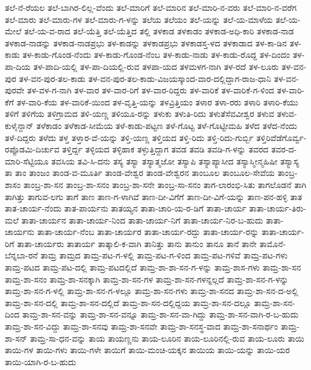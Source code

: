 ತಲೆ-ನೆ-ರೆಯಲ
ತಲೆ-ಬಾಗಿರ-ಲಿಲ್ಲ-ವೆಂದು
ತಲೆ-ಮಾರಿಗೆ
ತಲೆ-ಮಾರಿನ
ತಲೆ-ಮಾರಿ-ನ-ವರು
ತಲೆ-ಮಾರಿ-ನ-ವರೆಗ
ತಲೆ-ಮಾರು
ತಲೆ-ಮಾರು-ಗಳ
ತಲೆ-ಮಾರು-ಗ-ಳನ್ನು
ತಲೆಯ
ತಲೆಯಂ
ತಲೆ-ಯನ್ನು
ತಲೆ-ಯ-ಮಾಳೆಯ
ತಲೆ-ಯ-ಮೇಲೆ
ತಲೆ-ಯ-ವ-ರಾದ
ತಲೆ-ಯೆತ್ತಿ
ತಲೆ-ಯೆತ್ತಿದ
ತಲ್ಲಿ
ತಳಕಾಡ
ತಳಕಾಡಂ
ತಳಕಾಡ-ಅಧಿ-ಕಾರಿ
ತಳಕಾಡ-ನಾಡ
ತಳಕಾಡ-ನಾಡನ್ನು
ತಳಕಾಡ-ನಾಡಪ್ರಭು
ತಳ-ಕಾಡನ್ನು
ತಳಕಾಡಪ್ರಭು
ತಳಕಾಡಸ್ತ-ಳದ
ತಳಕಾಡಾದ
ತಳ-ಕಾ-ಡಿನ
ತಳ-ಕಾಡು
ತಳ-ಕಾಡು-ಗೊಂಡ-ನೆಂದು
ತಳ-ಕಾಡು-ಗೊಂಡ-ನೆಂಬ
ತಳ-ಕಾಡು-ನಾಡು
ತಳ-ಕಾಡು-ರೊದ್ದ
ತಳ-ದಿಂದಂ
ತಳ-ಪಾ-ದಿಯ
ತಳ-ಪಾದಿ-ಯಲ್ಲಿ
ತಳ-ಪಾ-ದಿಯಲ್ಲಿ-ರುವ
ತಳಪಾ-ಯದ
ತಳಮಳಗ-ನಾಗಿ
ತಳ-ರದೆ
ತಳ-ಲೂರು
ತಳ-ವನ-ಪುರ
ತಳ-ವನ-ಪುರ-ತಲ-ಕಾಡು
ತಳ-ವನ-ಪುರ-ತಲ-ಕಾಡು-ವಿಜಯಸ್ಕಾಂದ-ವಾರ-ದಲ್ಲಿದ್ದಾಗ-ರಾಜ-ಧಾನಿ
ತಳ-ವನ-ಪುರವೇ
ತಳ-ವಳ-ಗ-ನಾಗಿ
ತಳ-ವಾರ
ತಳ-ವಾರ-ರಿಗೆ
ತಳ-ವಾರ-ರಿದ್ದರು
ತಳ-ವಾರಿಕೆ
ತಳ-ವಾರಿಕೆ-ಗ-ಳಿಂದ
ತಳ-ವಾರಿ-ಕೆಗೆ
ತಳ-ವಾರಿ-ಕೆಯ
ತಳ-ವಾರಿಕೆ-ಯಿಂದ
ತಳ-ವೃತ್ತಿ-ಯನ್ನು
ತಳವ್ರಿತ್ತಿಯಂ
ತಳಾರ
ತಳಾ-ರರು
ತಳಾರಿ
ತಳಾರಿ-ಕೆಯು
ತಳಿಗೆ
ತಳಿಗೆಯ
ತಳಿಗ್ರಾಮದ
ತಳಿ-ಯಣ್ಣ
ತಳಿಯೂ-ರನ್ನು
ತಳುಕು
ತಳುತಿ-ರಿದು
ತಳುತೆಸೆವವೀಶ್ವರ
ತಳುವ
ತಳುವ-ಕುಳೈನ್ದಾನ್
ತಳೆಕಾಡಂ
ತಳೆಕಾಡ-ಸೀಮೆಯ
ತಳೆ-ಕಾಡು-ಪಟ್ಟಣ
ತಳೆ-ಗೊಟ್ಟ
ತಳೆ-ಗೊಟ್ಟೀಮಹಿ
ತಳೆದ
ತಳೆದ-ನೆಂದು
ತಳೆ-ದಿದ್ದರು
ತಳೆದು
ತಳ್ತ
ತಳ್ತಾರ-ವೆ-ಯನ್ನು
ತಳ್ತಿ-ಯಣ್ಣ
ತಳ್ತಿಯದ
ತಳ್ತಿ-ರಿದು
ತಳ್ತಿ-ರಿದು-ಗುರ್ಬ್ಬಿ
ತಳ್ತಿರಿವೆಡೆಗೊರ್ವ್ವ-ರಪ್ಪೊಡಮಿ-ದಿರ್ಚುವ
ತಳ್ತಿರ್ದ್ದ
ತಳ್ಳಿಯದ
ತಳ್ಳಿಹಾಕ
ತಳ್ಳುತ್ತಿದ್ದಾಗ
ತವಡ
ತವಡಿ
ತವಡಿ-ಗ-ಳನ್ನು
ತವರದ
ತವರ-ದ-ಮಾರಿ-ಸೆಟ್ಟಿಯೂ
ತವಸಿಯ
ತವಿ-ಸಿ-ದನು
ತಸ್ಯ
ತಸ್ಯಾ
ತಸ್ಯಾತ್ಮಜೋ
ತಸ್ಯಾಪಿ
ತಸ್ಯಾಪ್ಯಾಸೀದ
ತಸ್ಯಾಸ್ಮೀನ್ಮಹಿಷೀ
ತಸ್ಯಾಸ್ಯ
ತಾ
ತಾಂ
ತಾಂಜಂ
ತಾಂಡ-ವ-ಮೂರ್ತಿ
ತಾಂಡ-ವೇಶ್ವರ
ತಾಂಡ-ವೇಶ್ವರನ
ತಾಂಬೂಲ
ತಾಂಬೂಲ-ಸೇವೆಯ
ತಾಂಬ್ರ-ಶಾಸಂ
ತಾಂಬ್ರ-ಶಾ-ಸನ
ತಾಂಬ್ರ-ಶಾ-ಸನಂ
ತಾಂಬ್ರ-ಶಾ-ಸನೇ
ತಾಂಬ್ರ-ಸಾ-ಸನಂ
ತಾಗ-ಲಾರಂಭಿ-ಸಿತು
ತಾಗಲೊಡನೆ
ತಾಗಿ
ತಾಗಿತ್ತು
ತಾಗುವ-ಲಗು
ತಾಗೆ
ತಾಣ
ತಾಣ-ಗ-ಳಾಗಿವೆ
ತಾಣ-ದೀ-ವಿಗೆಗೆ
ತಾಣ-ದೀ-ವಿಗೆ-ಯನ್ನು
ತಾಣ-ಪನ-ಹಳ್ಳಿ
ತಾತ
ತಾತ-ಚಾರ್ಯ-ನೆಂದು
ತಾತ-ಪಾರ್ಯನು
ತಾತಯ್ಯನ
ತಾತಾ-ಚಾರಿ-ಯ-ರ-ಡಿಗೆ
ತಾತಾ-ಚಾರ್ಯ
ತಾತಾ-ಚಾರ್ಯ-ತಿರು-ಮಲೆ
ತಾತಾ-ಚಾರ್ಯನ
ತಾತಾ-ಚಾರ್ಯ-ನಿಂದ
ತಾತಾ-ಚಾರ್ಯ-ನಿಗೆ
ತಾತಾ-ಚಾರ್ಯ-ನಿರ-ಬ-ಹುದು
ತಾತಾ-ಚಾರ್ಯನು
ತಾತಾ-ಚಾರ್ಯ-ನೆಂಬ
ತಾತಾ-ಚಾರ್ಯರ
ತಾತಾ-ಚಾರ್ಯ-ರದ್ದು
ತಾತಾ-ಚಾರ್ಯ-ರನ್ನು
ತಾತಾ-ಚಾರ್ಯ-ರಿಗೆ
ತಾತಾ-ಚಾರ್ಯರು
ತಾತಾರ್ಯ
ತಾತ್ಕಾಲಿ-ಕ-ವಾಗಿ
ತಾನಿತ್ತು
ತಾನು
ತಾನುಂ
ತಾನೂ
ತಾನೆ
ತಾನೇ
ತಾಮೊನೆ-ಬೆನ್ನಬಾ-ರನೆ
ತಾಮ್ರ
ತಾಮ್ರದ
ತಾಮ್ರ-ಪಟ-ಗ-ಳಲ್ಲಿ
ತಾಮ್ರ-ಪಟ-ಗ-ಳಿಂದ
ತಾಮ್ರ-ಪಟ-ಗಳಿವೆ
ತಾಮ್ರ-ಪಟ-ಗಳು
ತಾಮ್ರ-ಪಟದ
ತಾಮ್ರ-ಪಟ-ದಲ್ಲಿ
ತಾಮ್ರ-ಪಟದಲ್ಲಿದೆ
ತಾಮ್ರ-ಶಾ-ಶಾ-ಸನ-ಗ-ಳನ್ನು
ತಾಮ್ರ-ಶಾಸ-ಗಳು
ತಾಮ್ರ-ಶಾ-ಸನ
ತಾಮ್ರ-ಶಾ-ಸನಂ
ತಾಮ್ರ-ಶಾ-ಸನಕ್ಕಾಗಿ
ತಾಮ್ರ-ಶಾ-ಸನ-ಗಳ
ತಾಮ್ರ-ಶಾ-ಸನ-ಗಳನ್ನಲ್ಲದೆ
ತಾಮ್ರ-ಶಾ-ಸನ-ಗ-ಳನ್ನು
ತಾಮ್ರ-ಶಾ-ಸನ-ಗ-ಳಲ್ಲಿ
ತಾಮ್ರ-ಶಾ-ಸನ-ಗ-ಳಲ್ಲೂ
ತಾಮ್ರ-ಶಾ-ಸನ-ಗಳು
ತಾಮ್ರ-ಶಾ-ಸನದ
ತಾಮ್ರ-ಶಾ-ಸನ-ದ-ಅಲ್ಲಿ
ತಾಮ್ರ-ಶಾ-ಸನ-ದಲ್ಲಿ
ತಾಮ್ರ-ಶಾ-ಸನ-ದಲ್ಲಿದೆ
ತಾಮ್ರ-ಶಾ-ಸನ-ದಲ್ಲಿದ್ದಯ
ತಾಮ್ರ-ಶಾ-ಸನ-ದಲ್ಲೂ
ತಾಮ್ರ-ಶಾ-ಸನ-ದಿಂದ
ತಾಮ್ರ-ಶಾ-ಸನ-ವನ್ನು
ತಾಮ್ರ-ಶಾ-ಸನ-ವನ್ನೂ
ತಾಮ್ರ-ಶಾ-ಸನ-ವಾ-ಗಿದ್ದು
ತಾಮ್ರ-ಶಾ-ಸನ-ವಾಗಿ-ರ-ಬ-ಹುದು
ತಾಮ್ರ-ಶಾ-ಸನ-ವಿದ್ದು
ತಾಮ್ರ-ಶಾ-ಸನವು
ತಾಮ್ರ-ಶಾ-ಸನವೇ
ತಾಮ್ರ-ಶಾ-ಸನಸ್ಥ-ವಾದ
ತಾಮ್ರ-ಶಾ-ಸನಾರ್ಥಂ
ತಾಮ್ರ-ಶಾ-ಸನ್
ತಾಮ್ರ-ಸಾ-ಧನ-ವನ್ನು
ತಾಯ
ತಾಯಣ್ಣನು
ತಾಯ-ಲೂರಿನ
ತಾಯ-ಲೂರಿನಲ್ಲಿ-ರುವ
ತಾಯ-ಲೂರು
ತಾಯಿ
ತಾಯಿ-ಗಳ
ತಾಯಿ-ಗಳು
ತಾಯಿ-ಗಳೇ
ತಾಯಿಗೆ
ತಾಯಿ-ಮಂಚಿ-ಯಕ್ಕನ
ತಾಯಿಯ
ತಾಯಿ-ಯನ್ನು
ತಾಯಿ-ಯರ
ತಾಯಿ-ಯಾಗಿ-ರ-ಬ-ಹುದು
